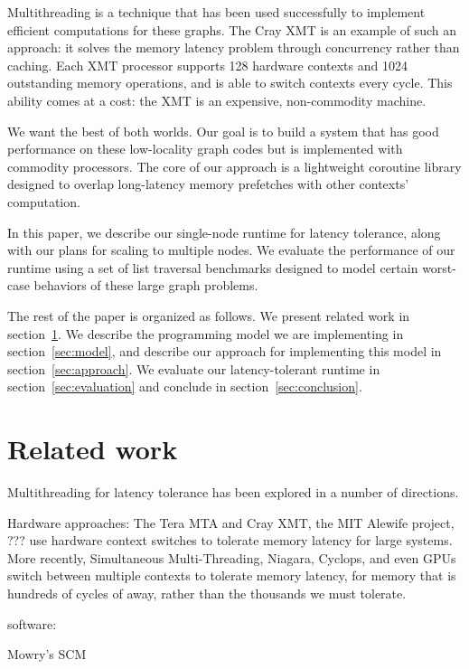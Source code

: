 \documentclass{acm_proc_article-sp}
\begin{document}
Multithreading is a technique that has been used successfully to
implement efficient computations for these graphs. The Cray XMT is an
example of such an approach: it solves the memory latency problem
through concurrency rather than caching. Each XMT processor supports
128 hardware contexts and 1024 outstanding memory operations, and is
able to switch contexts every cycle. This ability comes at a cost: the
XMT is an expensive, non-commodity machine.

We want the best of both worlds. Our goal is to build a system that
has good performance on these low-locality graph codes but is
implemented with commodity processors. The core of our approach is a
lightweight coroutine library designed to overlap long-latency memory
prefetches with other contexts' computation.

In this paper, we describe our single-node runtime for latency
tolerance, along with our plans for scaling to multiple nodes.  We
evaluate the performance of our runtime using a set of list traversal
benchmarks designed to model certain worst-case behaviors of these
large graph problems. 

The rest of the paper is organized as follows. We present related work
in section~\ref{sec:related}. We describe the programming model we are
implementing in section~\ref{sec:model}, and describe our approach for
implementing this model in section~\ref{sec:approach}. We evaluate our
latency-tolerant runtime in section~\ref{sec:evaluation} and conclude
in section~\ref{sec:conclusion}.

\section{Related work}
\label{sec:related}





Multithreading for latency tolerance has been explored in a number of directions.

Hardware approaches: The Tera MTA and Cray XMT, the MIT Alewife
project, ??? use hardware context switches to tolerate memory latency
for large systems. More recently, Simultaneous Multi-Threading,
Niagara, Cyclops, and even GPUs switch between multiple contexts to
tolerate memory latency, for memory that is hundreds of cycles of
away, rather than the thousands we must tolerate.


software:

Mowry's SCM
\end{document}
